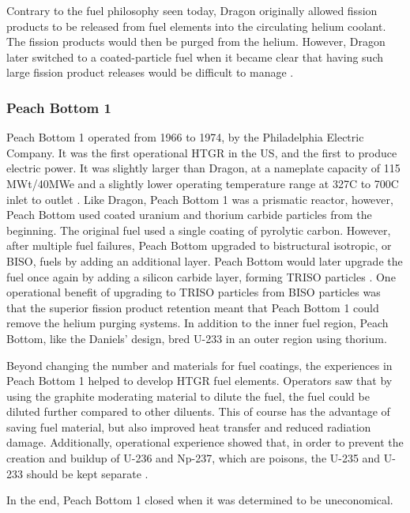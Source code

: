 Contrary to the fuel philosophy seen today, Dragon originally allowed fission products to be released from fuel elements into the circulating helium coolant.  The fission products would then be purged from the helium.  However, Dragon later switched to a coated-particle fuel when it became clear that having such large fission product releases would be difficult to manage \cite{simnad_early_1991}.

\subsubsection{Peach Bottom 1}

Peach Bottom 1 operated from 1966 to 1974, by the Philadelphia Electric Company.  It was the first operational HTGR in the US, and the first to produce electric power.  It was slightly larger than Dragon, at a nameplate capacity of 115 MWt/40MWe and a slightly lower operating temperature range at 327\textdegree  C to 700\textdegree  C inlet to outlet \cite{beck_high_nodate}.  Like Dragon, Peach Bottom 1 was a prismatic reactor, however, Peach Bottom used coated uranium and thorium carbide particles from the beginning.  The original fuel used a single coating of pyrolytic carbon.  However, after multiple fuel failures, Peach Bottom upgraded to bistructural isotropic, or BISO, fuels by adding an additional layer.  Peach Bottom would later upgrade the fuel once again by adding a silicon carbide layer, forming TRISO particles \cite{beck_high_nodate}.  One operational benefit of upgrading to TRISO particles from BISO particles was that the superior fission product retention meant that Peach Bottom 1 could remove the helium purging systems.  In addition to the inner fuel region, Peach Bottom, like the Daniels' design, bred U-233 in an outer region using thorium.

Beyond changing the number and materials for fuel coatings, the experiences in Peach Bottom 1 helped to develop HTGR fuel elements.  Operators saw that by using the graphite moderating material to dilute the fuel, the fuel could be diluted further compared to other diluents.  This of course has the advantage of saving fuel material, but also improved heat transfer and reduced radiation damage.  Additionally, operational experience showed that, in order to prevent the creation and buildup of U-236 and Np-237, which are poisons, the U-235 and U-233 should be kept separate \cite{simnad_early_1991}.

In the end, Peach Bottom 1 closed when it was determined to be uneconomical.

